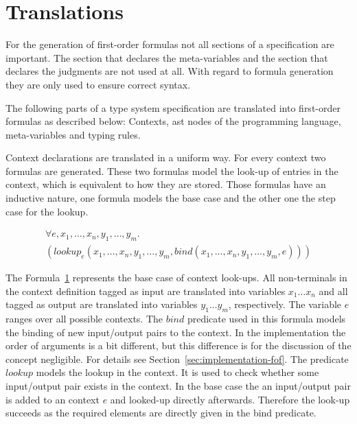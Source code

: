 \section{Translations}
\label{sec:translations}
For the generation of first-order formulas not all sections of a
specification are important. The section that declares the
meta-variables and the section that declares the judgments are not
used at all. With regard to formula generation they are only used to
ensure correct syntax.

The following parts of a type system specification are translated into
first-order formulas as described below: Contexts, \gls{ast} nodes of
the programming language, meta-variables and typing rules.


Context declarations are translated in a uniform way. For every
context two formulas are generated. These two formulas model the
look-up of entries in the context, which is equivalent to how they
are stored. Those formulas have an inductive nature, one formula
models the base case and the other one the step case for the lookup.

\begin{figure}
\begin{multline}
  \forall e, x_1, \dots, x_n, y_1, \dots, y_m . \\
  (lookup_e(x_1,\dots,x_n,y_1,\dots,y_m,
  bind(x_1,\dots,x_n,y_1,\dots,y_m,e)))
\end{multline}
\label{formula:context-base}
\end{figure}

The Formula~\ref{formula:context-base} represents the base case of
context look-ups. All non-terminals in the context definition
tagged as input are translated into variables $x_1 \dots x_n$ and all
tagged as output are translated into variables $y_1 \dots y_m$,
respectively. The variable $e$ ranges over all possible
contexts. The $bind$ predicate used in this formula models the
binding of new input/output pairs to the context. In the
implementation the order of arguments is a bit different, but this
difference is for the discussion of the concept negligible. For
details see Section~\ref{sec:implementation-fof}. The predicate
$lookup$ models the lookup in the context. It is used to check
whether some input/output pair exists in the context. In the base
case the an input/output pair is added to an context $e$ and
looked-up directly afterwards. Therefore the look-up succeeds as the
required elements are directly given in the bind predicate.

